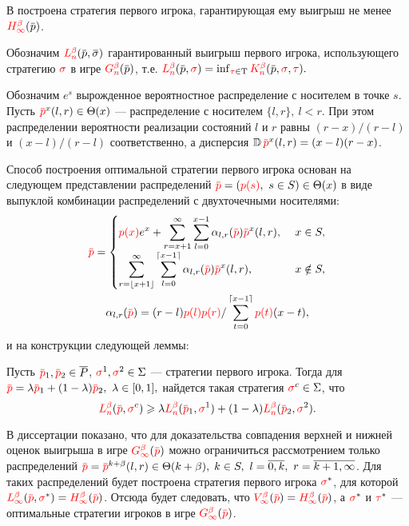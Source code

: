 В  построена стратегия первого игрока, гарантирующая ему выигрыш не менее $\H{\infty}(\p)$.

Обозначим $\L{n}(\p, \sigmav)$ гарантированный выигрыш первого игрока, использующего стратегию $\textcolor{red}{\sigma}$ в игре $\theG{n}(\p)$, т.е.
$
  \L{n}(\p, \sigmar) = \inf_{\taur \in \Tau} \K{n}(\p, \sigmar, \taur).
$

Обозначим $e^s$ вырожденное вероятностное распределение с носителем в точке $s$.
Пусть $\pd^x(l, r) \in \Theta(x)$ --- распределение с носителем $\{l, r\},\ l<r$.
При этом распределении вероятности реализации состояний $l$ и $r$ равны $(r-x)/(r-l)$ и $(x-l)/(r-l)$ соответственно, а дисперсия
$\D \pd^x(l, r) = (x - l)(r - x)$.

Способ построения оптимальной стратегии первого игрока основан на следующем представлении распределений $\pd = (\pc{s},\ s \in S) \in \Theta(x)$ в виде выпуклой комбинации распределений с двухточечными носителями:
\begin{gather}
  \label{ch2:lower-bound:eq:prob-decomp-sum}
  \pd = \begin{cases}
    \displaystyle
    \pc{x} e^x + \sum_{r=x+1}^\infty \sum_{l=0}^{x-1} \alpha_{l,r}(\pd) \pd^x(l, r),\ & x \in S,\\
    \displaystyle
    \sum_{r=\floor{x+1}}^\infty \sum_{l=0}^{\ceil{x-1}} \alpha_{l,r}(\pd) \pd^x(l, r),\ & x \notin S,\\
  \end{cases}\\
  \alpha_{l,r}(\pd) = (r-l) \pc{l} \pc{r} / \sum_{t=0}^{\ceil{x-1}} \pc{t} (x-t), \nonumber
\end{gather}
и на конструкции следующей леммы:
\begin{lemma}
  \label{ch2:lower-bound:lemma:convex-combination}
  Пусть $\pd_1, \pd_2 \in \MM$, $\textcolor{red}{\sigma}^1, \textcolor{red}{\sigma}^2 \in \Sigma$ --- стратегии первого игрока.
  Тогда для $\pd = \lambda \pd_1 + (1-\lambda) \pd_2,\ \lambda \in [0, 1],$ найдется такая стратегия $\textcolor{red}{\sigma}^c \in \Sigma$, что
  \[
    \L{n}(\pd, \sigmar^c) \geqslant
    \lambda \L{n}(\pd_1, \sigmar^1) + (1-\lambda) \L{n}(\pd_2, \sigmar^2).
  \]
\end{lemma}

В диссертации показано, что для доказательства совпадения верхней и нижней оценок выигрыша в игре $\theG{\infty}(\pd)$ можно ограничиться рассмотрением только распределений %
$\pd = \pd^{k+\beta}(l, r) \in \Theta(k + \beta), \; k \in S,\ l = \overline{0, k},\ r = \overline{k+1, \infty}$.
Для таких распределений будет построена стратегия первого игрока $\textcolor{red}{\sigma}^*$, для которой $\L{\infty}(\pd, \sigmar^*) = \H{\infty}(\pd)$.
Отсюда будет следовать, что $\V{\infty}(\pd) = \H{\infty}(\pd)$, а $\textcolor{red}{\sigma}^*$ и $\textcolor{red}{\tau}^*$ --- оптимальные стратегии игроков в игре $\theG{\infty}(\pd)$.

